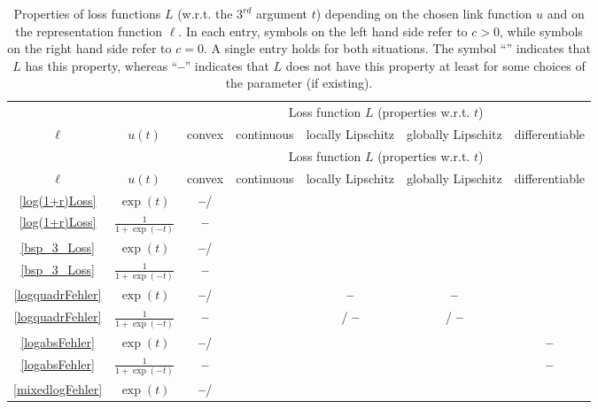 \documentclass[10pt]{article}
\newcommand{\anf}[1]{\enquote{#1}}
\newcommand{\xmark}{\textbf{--}}
\begin{document}
{\renewcommand{\arraystretch}{1.2}
	\begin{longtable}[c]{|c|c||c|c|c|c|c|}
		\caption{Properties of loss functions $L$ (w.r.t. the $3^{rd}$ argument $t$) depending on the chosen link function $u$ and on the representation function $\ell$. In each entry, symbols on the left hand side refer to $c>0$, while symbols on the right hand side refer to $c=0$. A single entry holds for both situations. The symbol \anf{\checkmark} indicates that $L$ has this property, whereas \anf{\xmark} indicates that $L$ does not have this property at least for some choices of the parameter (if existing).}
		\label{EigenschaftenL} \\
		
		&& \multicolumn{5}{c|}{Loss function $L$ (properties w.r.t. $t$) }\\
		$\ell$ & $u(t)$ & convex & continuous & locally Lipschitz & globally Lipschitz & differentiable \\
		\hline
		\endfirsthead
		&& \multicolumn{5}{c|}{Loss function $L$ (properties w.r.t. $t$) }\\
		$\ell$ & $u(t)$ & convex & continuous & locally Lipschitz & globally Lipschitz & differentiable \\
		\hline
		\endhead
		\eqref{log(1+r)Loss} & $\exp(t)$ & \xmark / \checkmark & \checkmark & \checkmark & \checkmark & \checkmark \\
		\eqref{log(1+r)Loss} & $\frac{1}{1+\exp(-t)}$ & \xmark & \checkmark & \checkmark & \checkmark & \checkmark \\
		\hline
		\eqref{bsp_3_Loss} & $\exp(t)$ & \xmark / \checkmark & \checkmark & \checkmark & \checkmark & \checkmark\\
		\eqref{bsp_3_Loss} & $\frac{1}{1+\exp(-t)}$ & \xmark & \checkmark & \checkmark  & \checkmark  & \checkmark  \\
		\hline
		\eqref{logquadrFehler} & $\exp(t)$ & \xmark / \checkmark & \checkmark & \xmark & \xmark & \checkmark \\
		\eqref{logquadrFehler} & $\frac{1}{1+\exp(-t)}$ & \xmark & \checkmark & \checkmark / \xmark & \checkmark / \xmark & \checkmark\\
		\hline
		\eqref{logabsFehler} & $\exp(t)$ & \xmark / \checkmark & \checkmark & \checkmark & \checkmark & \xmark\\
		\eqref{logabsFehler} & $\frac{1}{1+\exp(-t)}$ &\xmark &\checkmark& \checkmark & \checkmark & \xmark \\
		\hline
		\eqref{mixedlogFehler} & $\exp(t)$ & \xmark / \checkmark & \checkmark& \checkmark & \checkmark & \checkmark\\

\end{longtable}}
\end{document}

